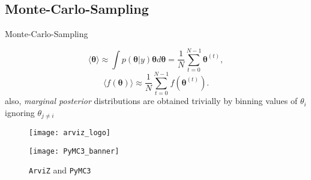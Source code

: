 \documentclass[11pt,aspectratio=1610,dvipsnames]{beamer}
\begin{document}
\subsection{Monte-Carlo-Sampling}
\begin{frame}{Monte-Carlo-Sampling}
	\begin{minipage}{\linewidth}
		\begin{minipage}{0.6\linewidth}
			\begin{tcolorbox}[colback=black!5,colframe=gray!15!black,title={Benefits of Monte-Carlo-Sampling}] 
				 \begin{equation}
					\langle \boldsymbol{\theta}\rangle\approx \int p(\boldsymbol{\theta} | y)\boldsymbol{\theta}d\boldsymbol{\theta}=\frac{1}{N}\sum_{t=0}^{N-1}\boldsymbol{\theta}^{(t)},
				\end{equation}
				 \begin{equation}
					\langle f(\boldsymbol{\theta})\rangle\approx\frac{1}{N}\sum_{t=0}^{N-1}f(\boldsymbol{\theta}^{(t)}).
				\end{equation}
				also, \emph{marginal posterior} distributions are obtained trivially by binning values of $\theta_i$ ignoring $\theta_{j\neq i}$ \citet{Trotta_2008}
			\end{tcolorbox}
		\end{minipage}
		\hfill
		\begin{minipage}{0.3\linewidth}
			\begin{figure}
				\texttt{[image: arviz\_logo]}
				\vspace{0.1cm}
				
				\texttt{[image: PyMC3\_banner]}
				\caption{\texttt{ArviZ} \citet{ArviZ} and \texttt{PyMC3} \citet{PyMC3}}
			\end{figure}
			
		\end{minipage}
	\end{minipage}
	
	
\end{frame}
\end{document}

